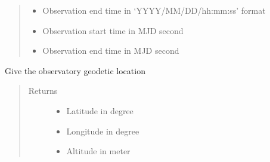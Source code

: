 \documentclass[letterpaper,10pt,english]{sphinxmanual}
\begin{document}
\begin{fulllineitems}
\begin{fulllineitems}
\begin{quote}
\begin{description}
\begin{itemize}
\item {} 
\sphinxAtStartPar
{} \textendash{} Observation end time in ‘YYYY/MM/DD/hh:mm:ss’ format

\item {} 
\sphinxAtStartPar
{} \textendash{} Observation start time in MJD second

\item {} 
\sphinxAtStartPar
{} \textendash{} Observation end time in MJD second

\end{itemize}


\end{description}\end{quote}

\end{fulllineitems}


\begin{fulllineitems}
\label{\detokenize{paircars:paircars.access_ms.AccessMS.get_observatory_loc}}
\sphinxAtStartPar
Give the observatory geodetic location
\begin{quote}\begin{description}
\item[{Returns}] \leavevmode
\sphinxAtStartPar
\begin{itemize}
\item {} 
\sphinxAtStartPar
{} \textendash{} Latitude in degree

\item {} 
\sphinxAtStartPar
{} \textendash{} Longitude in degree

\item {} 
\sphinxAtStartPar
{} \textendash{} Altitude in meter

\end{itemize}


\end{description}\end{quote}

\end{fulllineitems}



\end{fulllineitems}
\end{document}
